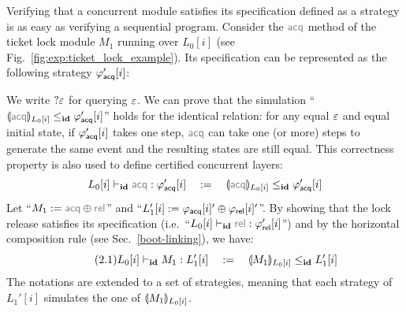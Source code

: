 Verifying that a concurrent module satisfies its specification 
defined as a strategy is as easy as verifying a sequential program.
Consider the $\commc{acq}$ method of the ticket lock module $M_1$ running 
over $L_0[i]$ (see Fig.~\ref{fig:exp:ticket_lock_example}). 
Its  specification
can be represented as the following strategy $\varphi_{\mathsf{\textcolor{black}{acq}}}'[i]$:
\begin{center}
\end{center}
We write $?\oracle$ for querying $\oracle$.
We can prove that the simulation ``$\ssem{\commc{acq}}{L_0[i]}\le_\id \strat{\comm{acq}}'[i]$'' holds for the identical relation: for any equal $\oracle$
and equal initial state, if $\varphi_{\mathsf{\textcolor{black}{acq}}}'[i]$ takes one step, $\commc{acq}$ can take one (or more) steps to generate the same event and the resulting states are still equal. This correctness property is also used to define certified concurrent layers:
$$\ltyp{L_0[i]}{\id}{\commc{acq}}{\strat{\comm{acq}}'[i]}
\quad := \quad  \ssem{\commc{acq}}{L_0[i]}\le_\id \strat{\comm{acq}}'[i]$$
Let ``$M_1:= \commc{acq} \oplus \commc{rel}$''
and ``$L_1'[i]:= \varphi_{\mathsf{\textcolor{black}{acq}}}[i]'\oplus \varphi_{\mathsf{\textcolor{black}{rel}}}[i]'$''. By showing that the lock release    satisfies its specification
(i.e.\, ``$\ltyp{L_0[i]}{\id}{\commc{rel}}{\strat{\comm{rel}}'[i]}$'')
and by the horizontal composition rule (see Sec.~\ref{boot-linking}), we have:
\begin{equation} \label{eq:acq} \tag{2.1}
L_0[i] \vdash_{\textbf{id}} M_1 : L_1'[i]\quad:=\quad \llparenthesis M_1 \rrparenthesis_{L_0[i]}\le_{\textbf{id}} L_1'[i]
\end{equation}
The notations are extended to a set of strategies,  meaning that each strategy of $L_1'[i]$ simulates the one of $\llparenthesis M_1 \rrparenthesis_{L_0[i]}$. 


